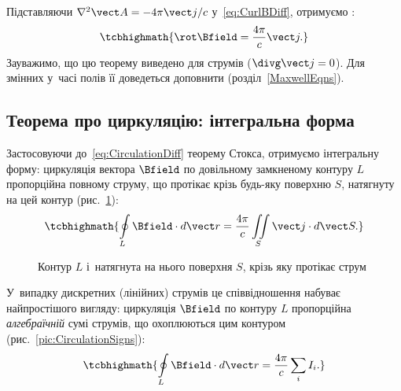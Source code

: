 Підставляючи $\nabla^2\vect A = -4\pi\vect j/c$ у~\eqref{eq:CurlBDiff}, отримуємо
:
\begin{equation}\label{eq:CirculationDiff}
	\tcbhighmath{
		\rot\Bfield = \frac{4\pi}c\vect j.
	}
\end{equation}
Зауважимо, що цю теорему виведено для  струмів ($\divg\vect j = 0$).
Для змінних у~часі полів її доведеться доповнити 
(розділ~\ref{MaxwellEqns}).


\subsection*{Теорема про циркуляцію: інтегральна форма}


Застосовуючи до~\eqref{eq:CirculationDiff} теорему Стокса, отримуємо інтегральну форму:
циркуляція вектора $\Bfield$ по довільному замкненому контуру $L$ пропорційна повному
струму, що протікає крізь будь-яку поверхню $S$, натягнуту на цей контур
(рис.~\ref{pic:CirculationLoop}):
\begin{equation*}
	\tcbhighmath{
		\oint\limits_L \Bfield\cdot d\vect r = \frac{4\pi}c \iint\limits_S \vect j\cdot d\vect S.
	}
\end{equation*}

\begin{figure}\centering
	\caption{Контур $L$ і~натягнута на нього поверхня $S$, крізь яку протікає
		струм\label{pic:CirculationLoop}}
\end{figure}

У~випадку дискретних (лінійних) струмів це співвідношення набуває найпростішого вигляду:
циркуляція $\Bfield$ по контуру $L$ пропорційна \emph{алгебраїчній} сумі струмів, що
охоплюються цим контуром (рис.~\ref{pic:CirculationSigns}):
\begin{equation}\label{eq:CirculationDiscrete}
	\tcbhighmath{
		\oint\limits_L \Bfield\cdot d\vect r = \frac{4\pi}c \sum\limits_i I_i.
	}
\end{equation}

